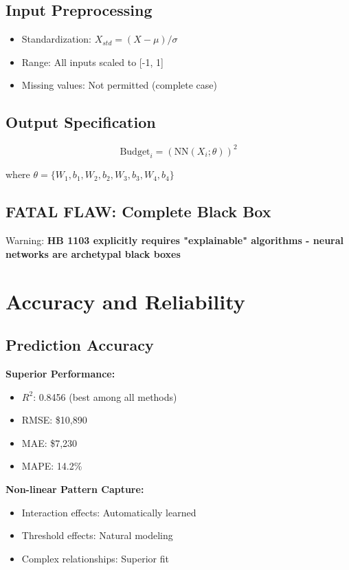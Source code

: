 \subsection{Input Preprocessing}

\begin{itemize}
    \item Standardization: $X_{std} = (X - \mu) / \sigma$
    \item Range: All inputs scaled to [-1, 1]
    \item Missing values: Not permitted (complete case)
\end{itemize}

\subsection{Output Specification}

\begin{equation}
\text{Budget}_i = \left(\text{NN}(X_i; \theta)\right)^2
\end{equation}

where $\theta = \{W_1, b_1, W_2, b_2, W_3, b_3, W_4, b_4\}$

\subsection{FATAL FLAW: Complete Black Box}

Warning: \textbf{HB 1103 explicitly requires "explainable" algorithms - neural networks are archetypal black boxes}

\section{Accuracy and Reliability}

\subsection{Prediction Accuracy}

\textbf{Superior Performance:}
\begin{itemize}
    \item $R^2$: 0.8456 (best among all methods)
    \item RMSE: \$10,890
    \item MAE: \$7,230
    \item MAPE: 14.2\%
\end{itemize}

\textbf{Non-linear Pattern Capture:}
\begin{itemize}
    \item Interaction effects: Automatically learned
    \item Threshold effects: Natural modeling
    \item Complex relationships: Superior fit
\end{itemize}

